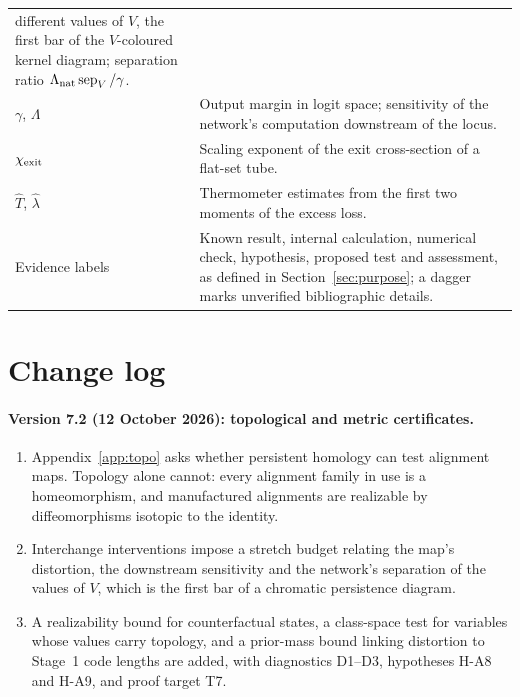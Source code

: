 \documentclass[11pt,a4paper]{article}
\begin{document}
\begin{longtable}{@{}P{3.2cm}P{11.7cm}@{}}
different values of $V$, the first bar of the $V$-coloured kernel diagram;
separation ratio $\Lambda_{\rm nat}\operatorname{sep}_V/\gamma$. \\ \addlinespace
$\gamma$, $\Lambda$ & Output margin in logit space; sensitivity of the
network's computation downstream of the locus. \\ \addlinespace
$\chi_{\rm exit}$ & Scaling exponent of the exit cross-section of a
flat-set tube. \\ \addlinespace
$\hat T$, $\hat\lambda$ & Thermometer estimates from the first two
moments of the excess loss. \\ \addlinespace
Evidence labels & Known result, internal calculation, numerical check,
hypothesis, proposed test and assessment, as defined in
Section~\ref{sec:purpose}; a dagger marks unverified bibliographic
details. \\
\bottomrule
\end{longtable}

\section{Change log}

\paragraph{Version 7.2 (12 October 2026): topological and metric certificates.}
\begin{enumerate}[leftmargin=*]
\item Appendix~\ref{app:topo} asks whether persistent homology can test
alignment maps. Topology alone cannot: every alignment family in use is a
homeomorphism, and manufactured alignments are realizable by diffeomorphisms
isotopic to the identity.
\item Interchange interventions impose a stretch budget relating the map's
distortion, the downstream sensitivity and the network's separation of the
values of $V$, which is the first bar of a chromatic persistence diagram.
\item A realizability bound for counterfactual states, a class-space test for
variables whose values carry topology, and a prior-mass bound linking
distortion to Stage~1 code lengths are added, with diagnostics D1--D3,
hypotheses H-A8 and H-A9, and proof target T7.
\end{enumerate}
\end{document}
